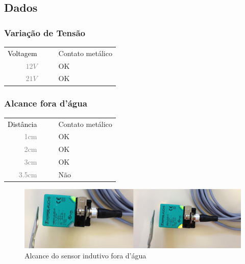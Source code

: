 

\subsection{Dados}
\subsubsection{Variação de Tensão}
\begin{table}[h!]
	\begin{tabular}{r l|l p{12cm} }
		\textcolor{black}{Voltagem} &&& 	{Contato metálico}\\
		\textcolor{gray}{$12V$} &&& 				{OK}\\
		\textcolor{gray}{$21V$} &&& 				{OK}\\
 	\end{tabular}
\end{table}

\subsubsection{Alcance fora d'água}
\begin{table}[h!]
	\begin{tabular}{r l|l p{12cm} }
		\textcolor{black}{Distância} &&& 	{Contato metálico}\\
		\textcolor{gray}{1cm} &&& 				{OK}\\
		\textcolor{gray}{2cm} &&& 				{OK}\\
		\textcolor{gray}{3cm} &&& 				{OK}\\
		\textcolor{gray}{3.5cm} &&& 				{Não}\\
 	\end{tabular}
\end{table}

\begin{figure}[h!]
 \centering
 \includegraphics[width=1\columnwidth]{indutivo/figs/indutivo_alcance.png}
 \caption{Alcance do sensor indutivo fora d'água}
 \label{fig:indu_alc}
 \end{figure}
 
